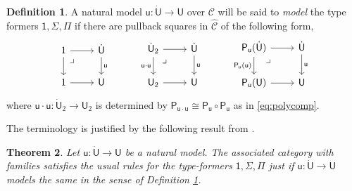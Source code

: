 \documentclass[12pt,reqno]{amsart}
\newcommand{\CC}{\ensuremath{\mathcal{C}}}
\newcommand{\alg}[1]{\ensuremath{\mathsf{#1}}}
\renewcommand{\to}{\ensuremath{\rightarrow}}
\renewcommand{\t}{\ensuremath{\mathsf{u}}}
\newcommand{\T}{\ensuremath{\mathsf{U}}}
\newcommand{\TT}{\ensuremath{\dot{\mathsf{U}}}}
\newcommand{\tT}{\ensuremath{{\t}:\TT\to\T}}
\newcommand{\pbcorner}{\arrow[dr,phantom,"\lrcorner" very near start, shift right=.5ex]} %
\newtheorem{theorem}{Theorem}
\theoremstyle{remark}
\theoremstyle{definition}
\newtheorem{definition}[theorem]{Definition}
\begin{document}
\begin{definition}\label{def:modelthetypeformers}
A natural model $\tT$ over $\CC$ will be said to \emph{model} the type formers $ \mathsf{1}, \Sigma, \Pi$ if there are pullback squares in $\widehat{\CC}$ of the following form,
%
\begin{equation}\label{diag:naturalmodelPiSigma1}
\begin{tikzcd}
	1 \ar[r] \ar[d] \pbcorner &  \TT \ar[d, "\t"]\\  
	1 \ar[r] & \T
 \end{tikzcd} \qquad \quad 
 \begin{tikzcd}
	\TT_2  \ar[r] \ar[d,swap,"\t\cdot\t"] \pbcorner &  \TT \ar[d, "\t"]\\  
	\T_2 \ar[r] & \T
	 \end{tikzcd} \qquad \quad 
	 \begin{tikzcd}
	 \alg{P}_\t(\TT) \ar[r] \ar[d,swap,"\alg{P}_\t(\t)"] \pbcorner &  \TT \ar[d, "\t"]\\  
	\alg{P}_\t(\T) \ar[r] & \T
 \end{tikzcd} 
 \end{equation}
%
where $\t\cdot\t : \dot{\T}_2 \to \T_2$ is determined by $\alg{P}_{\t\cdot\t} \cong  \alg{P}_{\t} \circ \alg{P}_{\t}$ as in \eqref{eq:polycomp}.
\end{definition}
%
The terminology is justified by the following result from \cite[Theorem 16]{awodey:NM}.
%
\begin{theorem}\label{thm:nmcwf}
Let $\tT$ be a natural model. The associated category with families satisfies the usual rules for the type-formers $\mathsf{1}, \Sigma, \Pi$ just if $\tT$ models the same in the sense of Definition \ref{def:modelthetypeformers}.
\end{theorem}
\end{document}
